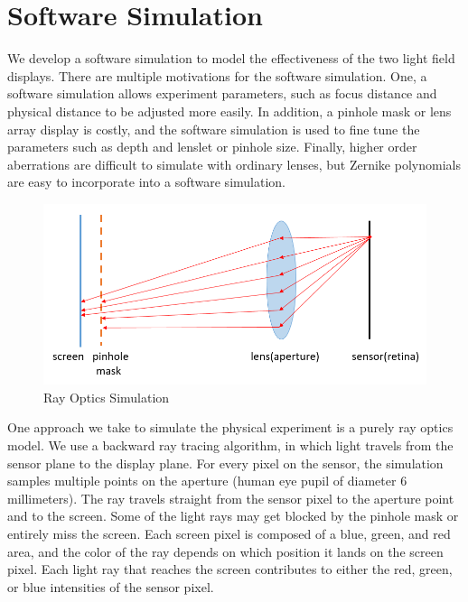 \chapter{Software Simulation}

We develop a software simulation to model the effectiveness of the two light field displays. There are multiple motivations for the software simulation. One, a software simulation allows experiment parameters, such as focus distance and physical distance to be adjusted more easily. In addition, a pinhole mask or lens array display is costly, and the software simulation is used to fine tune the parameters such as depth and lenslet or pinhole size. Finally, higher order aberrations are difficult to simulate with ordinary lenses, but Zernike polynomials are easy to incorporate into a software simulation.

\begin{figure}[ht]
  \centering
  \includegraphics[width=5in]{chapters/chapter6/images/Ray_Simulation.png}
  \caption{Ray Optics Simulation}
  \label{fig:ray_optics}
\end{figure}

One approach we take to simulate the physical experiment is a purely ray optics model. We use a backward ray tracing algorithm, in which light travels from the sensor plane to the display plane. For every pixel on the sensor, the simulation samples multiple points on the aperture (human eye pupil of diameter 6 millimeters). The ray travels straight from the sensor pixel to the aperture point and to the screen. Some of the light rays may get blocked by the pinhole mask or entirely miss the screen. Each screen pixel is composed of a blue, green, and red area, and the color of the ray depends on which position it lands on the screen pixel. Each light ray that reaches the screen contributes to either the red, green, or blue intensities of the sensor pixel.


